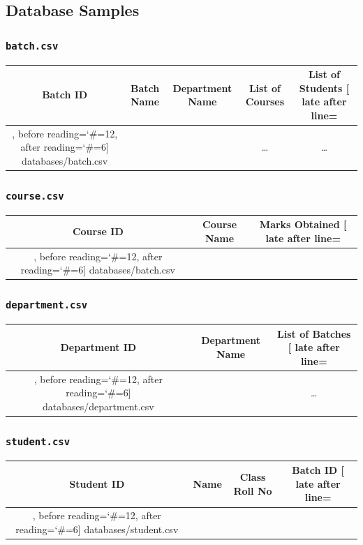 \documentclass{article}
\begin{document}
\subsection{Database Samples}
	\begin{center}
		\subsubsection*{\texttt{batch.csv}}
		\begin{longtable}{|c|c|c|c|c|}
			\hline
			Batch ID & Batch Name & Department Name & List of Courses & List of Students\hline
			\csvreader[
				late after line=\\\hline,
				before reading={\catcode`\#=12},
				after reading={\catcode`\#=6}]
			{databases/batch.csv}{}
			{\csvcoli & \csvcolii & \csvcoliii & \ldots{} & \ldots{}}
		\end{longtable}
		\subsubsection*{\texttt{course.csv}}
		\begin{longtable}{|c|c|c|}
			\hline
			Course ID & Course Name & Marks Obtained\hline
			\csvreader[
				late after line=\\\hline,
				before reading={\catcode`\#=12},
				after reading={\catcode`\#=6}]
			{databases/batch.csv}{}
			{\csvcoli & \csvcolii & \csvcoliii}
		\end{longtable}
		\subsubsection*{\texttt{department.csv}}
		\begin{longtable}{|c|c|c|}
			\hline
			Department ID & Department Name & List of Batches\hline
			\csvreader[
				late after line=\\\hline,
				before reading={\catcode`\#=12},
				after reading={\catcode`\#=6}]
			{databases/department.csv}{}
			{\csvcoli & \csvcolii & \ldots{}}
		\end{longtable}
		\subsubsection*{\texttt{student.csv}}
		\begin{longtable}{|c|c|c|c|}
			\hline
			Student ID & Name & Class Roll No & Batch ID\hline
			\csvreader[
				late after line=\\\hline,
				before reading={\catcode`\#=12},
				after reading={\catcode`\#=6}]
			{databases/student.csv}{}
			{\csvcoli & \csvcolii & \csvcoliii & \csvcoliv}
		\end{longtable}
	\end{center}
\end{document}
